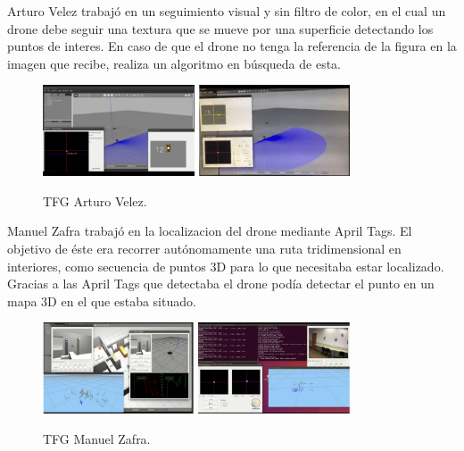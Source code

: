 \hspace{1 cm} Arturo Velez \cite{MediaWikiArturoVelezDuque} trabaj\'o en un seguimiento visual y sin filtro de color, en el cual un drone debe seguir una textura que se mueve por una superficie detectando los puntos de interes. En caso de que el drone no tenga la referencia de la figura en la imagen que recibe, realiza un algoritmo en b\'usqueda de esta.
\begin{figure}[H]
 \centering
    \includegraphics[width=0.4\textwidth]{imgs/ArturoVelez1_1.png}
    \includegraphics[width=0.4\textwidth]{imgs/ArturoVelez2_1.png}
 \caption{TFG Arturo Velez.}
 \label{f:ArturoVelez}
\end{figure} 


\hspace{1 cm} Manuel Zafra trabaj\'o \cite{MediaWikiManuelZafraVillar} en la localizacion del drone mediante April Tags. El objetivo de \'este era recorrer aut\'onomamente una ruta tridimensional en interiores, como secuencia de puntos 3D para lo que necesitaba estar localizado. Gracias a las April Tags que detectaba el drone pod\'ia detectar el punto en un mapa 3D en el que estaba situado.
\begin{figure}[H]
 \centering
    \includegraphics[width=0.4\textwidth]{imgs/ManuelZafra1_1.png}
    \includegraphics[width=0.4\textwidth]{imgs/ManuelZafra2_1.png}
 \caption{TFG Manuel Zafra.}
 \label{f:ManuelZafra}
\end{figure} 

